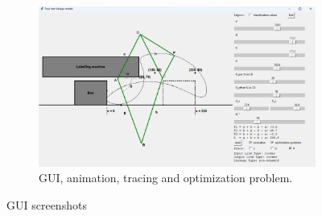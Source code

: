 \documentclass{article}
\begin{document}
\begin{figure}[h]
\begin{subfigure}{0.7\textwidth}
		\includegraphics[width=\linewidth]{./figures/GUI_screenshots/GUI_optimization_problem.png}
		\caption{GUI, animation, tracing and optimization problem.}
		\label{fig:GUI_optimization_problem}
	\end{subfigure}
	\caption{GUI screenshots}
\end{figure}
\end{document}
